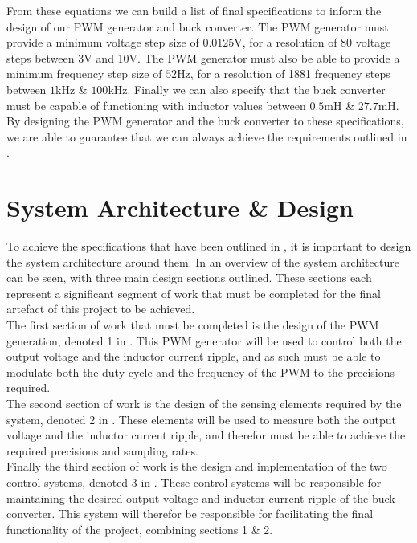 From these equations we can build a list of final specifications to inform the design of our PWM generator and buck converter. The PWM generator must provide a minimum voltage step size of $0.0125$V, for a resolution of 80 voltage steps between 3V and 10V. The PWM generator must also be able to provide a minimum frequency step size of $52$Hz, for a resolution of 1881 frequency steps between $1$kHz \& $100$kHz. Finally we can also specify that the buck converter must be capable of functioning with inductor values between $0.5$mH \& $27.7$mH. \\

By designing the PWM generator and the buck converter to these specifications, we are able to guarantee that we can always achieve the requirements outlined in .

\section{System Architecture \& Design}\label{S:system}

To achieve the specifications that have been outlined in , it is important to design the system architecture around them. In  an overview of the system architecture can be seen, with three main design sections outlined. These sections each represent a significant segment of work that must be completed for the final artefact of this project to be achieved. \\

The first section of work that must be completed is the design of the PWM generation, denoted 1 in . This PWM generator will be used to control both the output voltage and the inductor current ripple, and as such must be able to modulate both the duty cycle and the frequency of the PWM to the precisions required. \\

The second section of work is the design of the sensing elements required by the system, denoted 2 in . These elements will be used to measure both the output voltage and the inductor current ripple, and therefor must be able to achieve the required precisions and sampling rates. \\

Finally the third section of work is the design and implementation of the two control systems, denoted 3 in . These control systems will be responsible for maintaining the desired output voltage and inductor current ripple of the buck converter. This system will therefor be responsible for facilitating the final functionality of the project, combining sections 1 \& 2. \\

